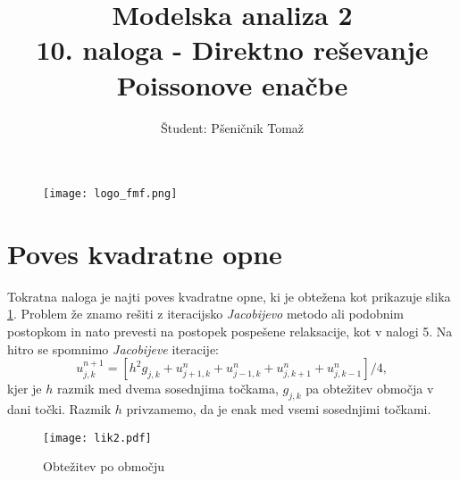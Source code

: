 \documentclass[12pt,a4paper]{article}
\title{\textbf{Modelska analiza 2} \\ 10. naloga - Direktno reševanje Poissonove enačbe \\}
\author{Študent: Pšeničnik Tomaž}
\begin{document}

	\begin{figure} [h]
  \centering
  \texttt{[image: logo\_fmf.png]}
  \maketitle
\end{figure}
	
	
	
	\newpage
	
	

\section*{Poves kvadratne opne}

Tokratna naloga je najti poves kvadratne opne, ki je obtežena kot prikazuje slika \ref{fig:slika1}. Problem že znamo rešiti z iteracijsko \textit{Jacobijevo} metodo ali podobnim postopkom in nato prevesti na postopek pospešene relaksacije, kot v nalogi 5. Na hitro se spomnimo \textit{Jacobijeve} iteracije:
\begin{equation} \label{eq:enacba1}
 u_{j,k} ^{n+1}= \left[h^{2}g_{j,k} + u_{j+1,k}^{n} + u_{j-1,k}^{n} + u_{j,k+1}^{n} + u_{j,k-1}^{n} \right]/4,
\end{equation}
kjer je $h$ razmik med dvema sosednjima točkama, $g_{j,k}$ pa obtežitev območja v dani točki. Razmik $h$ privzamemo, da je enak med vsemi sosednjimi točkami.

\begin{figure}[H]
\begin{center}
\texttt{[image: lik2.pdf]}
\caption{Obtežitev po območju} \label{fig:slika1}
\end{center}
\end{figure} 
\end{document}
